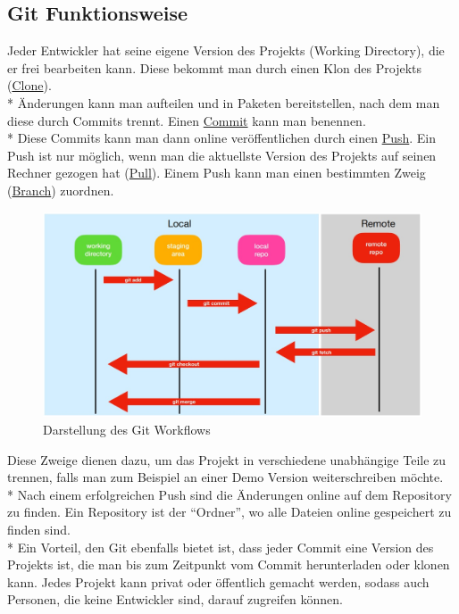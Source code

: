 \subsection{Git Funktionsweise}
Jeder Entwickler hat seine eigene Version des Projekts (Working Directory), die er frei bearbeiten kann. Diese bekommt man durch einen Klon des Projekts (\hyperref[sec:Clone]{Clone}). \\* Änderungen kann man aufteilen und 
in Paketen bereitstellen, nach dem man diese durch Commits trennt. Einen \hyperref[sec:Commit]{Commit} kann man benennen. \\*
Diese Commits kann man dann online veröffentlichen durch einen \hyperref[sec:Push]{Push}. Ein Push ist nur möglich, wenn man die aktuellste Version des Projekts
auf seinen Rechner gezogen hat (\hyperref[sec:Pull]{Pull}). 
Einem Push kann man einen bestimmten Zweig (\hyperref[sec:Branch]{Branch}) zuordnen. 
\begin{figure}[htp]
    \author{David Ignjatovic}
    \centering
    \includegraphics[scale=0.35]{pics/GitWorkflow.jpg}
    \caption{Darstellung des Git Workflows}
    \label{fig:impl:GitWorkflow}
\end{figure}
Diese Zweige dienen dazu, um das Projekt in verschiedene
unabhängige Teile zu trennen, falls man zum Beispiel an einer Demo Version weiterschreiben möchte. \\* Nach einem erfolgreichen Push sind die Änderungen
online auf dem Repository zu finden. Ein Repository ist der ``Ordner'', wo alle Dateien online gespeichert zu finden sind. 
\\* Ein Vorteil, den Git ebenfalls bietet ist, dass jeder Commit eine Version des Projekts ist, die man bis zum Zeitpunkt vom Commit herunterladen oder klonen kann.
Jedes Projekt kann privat oder öffentlich gemacht werden, sodass auch Personen, die keine Entwickler sind, darauf zugreifen können.
\cite{GitExpl} 



